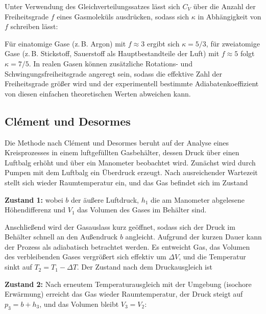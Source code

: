 Unter Verwendung des Gleichverteilungssatzes lässt sich \(C_V\) über die Anzahl der Freiheitsgrade \(f\) eines Gasmoleküls ausdrücken, sodass sich \(\kappa\) in Abhängigkeit von \(f\) schreiben lässt:


Für einatomige Gase (z.\,B. Argon) mit \(f \approx 3\) ergibt sich \(\kappa = 5/3\), für zweiatomige Gase (z.\,B. Stickstoff, Sauerstoff als Hauptbestandteile der Luft) mit \(f \approx 5\) folgt \(\kappa = 7/5\). In realen Gasen können zusätzliche Rotations- und Schwingungsfreiheitsgrade angeregt sein, sodass die effektive Zahl der Freiheitsgrade größer wird und der experimentell bestimmte Adiabatenkoeffizient von diesen einfachen theoretischen Werten abweichen kann.

\newpage
\subsection{Clément und Desormes}

Die Methode nach Clément und Desormes beruht auf der Analyse eines Kreisprozesses in einem luftgefüllten Gasbehälter, dessen Druck über einen Luftbalg erhöht und über ein Manometer beobachtet wird. Zunächst wird durch Pumpen mit dem Luftbalg ein Überdruck erzeugt. Nach ausreichender Wartezeit stellt sich wieder Raumtemperatur ein, und das Gas befindet sich im Zustand


\textbf{Zustand 1:}
wobei \(b\) der äußere Luftdruck, \(h_1\) die am Manometer abgelesene Höhendifferenz und \(V_1\) das Volumen des Gases im Behälter sind.

Anschließend wird der Gasauslass kurz geöffnet, sodass sich der Druck im Behälter schnell an den Außendruck \(b\) angleicht. Aufgrund der kurzen Dauer kann der Prozess als adiabatisch betrachtet werden. Es entweicht Gas, das Volumen des verbleibenden Gases vergrößert sich effektiv um \(\Delta V\), und die Temperatur sinkt auf \(T_2 = T_1 - \Delta T\). Der Zustand nach dem Druckausgleich ist

\textbf{Zustand 2:}
Nach erneutem Temperaturausgleich mit der Umgebung (isochore Erwärmung) erreicht das Gas wieder Raumtemperatur, der Druck steigt auf \(p_3 = b + h_3\), und das Volumen bleibt \(V_3 = V_2\):

